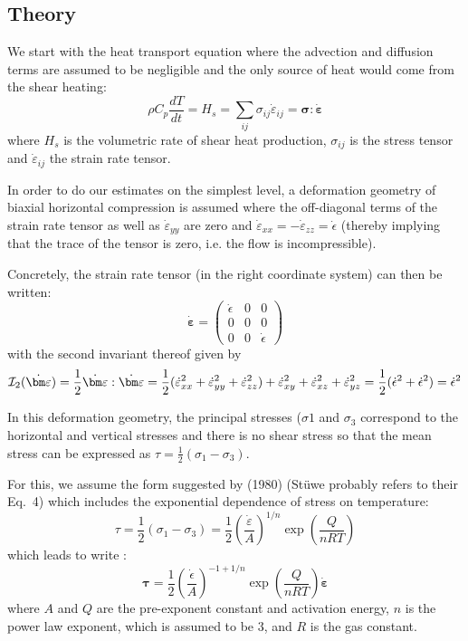 \subsection*{Theory}

We start with the heat transport equation where the advection and diffusion terms 
are assumed to be negligible and the only source of heat would come from the shear heating:
\[
\rho C_p \frac{dT}{dt} = H_s = \sum_{ij}\sigma_{ij} \dot{\varepsilon}_{ij} = 
{\bm \sigma} : \dot{\bm \varepsilon}
\]
where $H_s$ is the volumetric rate of shear heat production, 
$\sigma_{ij}$ is the stress tensor and  $\dot{\varepsilon}_{ij}$ the strain rate tensor.

In order to do our estimates on the simplest level, a deformation
geometry of biaxial horizontal compression is assumed where the off-diagonal terms of the strain rate
tensor as well as $\dot{\varepsilon}_{yy}$ are zero and $\dot{\varepsilon}_{xx}=-\dot{\varepsilon}_{zz}
=\dot{\epsilon}$ (thereby implying that the trace of the tensor is zero, i.e. the flow
is incompressible).

Concretely, the strain rate tensor (in the right coordinate system) can then be written:
\[
\dot{\bm \varepsilon} = 
\left(
\begin{array}{ccc}
\dot\epsilon &0 & 0 \\
0 &0 & 0 \\
0 & 0 & \dot\epsilon
\end{array}
\right)
\]
with the second invariant thereof given by
\[
{\cal I}_2(\dot{\bm \varepsilon}) 
= \frac12 \dot{\bm \varepsilon}:\dot{\bm \varepsilon}
= \frac12 (
\dot\varepsilon^2_{xx} + \dot\varepsilon^2_{yy} + \dot\varepsilon^2_{zz}
)+ 
\dot\varepsilon^2_{xy} + \dot\varepsilon^2_{xz} + \dot\varepsilon^2_{yz}
=\frac12 ( \dot\epsilon^2 + \dot\epsilon^2)
= \dot\epsilon^2
\]

In this deformation geometry, the principal stresses ($\sigma1$ and $\sigma_3$ correspond 
to the horizontal and vertical stresses and there is no shear stress so that 
the mean stress can be expressed as $\tau = \frac12(\sigma_1-\sigma_3)$.

For this, we assume the form suggested by \textcite{brko80} (1980) 
(St\"uwe probably refers to their Eq.~4)
which includes the exponential dependence of stress on temperature:
\[
\tau = \frac{1}{2} (\sigma_1-\sigma_3) = \frac12 \left(\frac{\dot\varepsilon}{A} \right)^{1/n}
\exp \left( \frac{Q}{nRT} \right)
\]
which leads to write :
\[
{\bm \tau} = \frac12 \left(\frac{\dot\epsilon}{A} \right)^{-1+1/n}
\exp \left(\frac{Q}{nRT} \right) \dot{\bm \varepsilon}
\]
where $A$ and $Q$ are the pre-exponent constant and activation energy, $n$ is the power law exponent, 
which is assumed to be 3, and $R$ is the gas constant.

